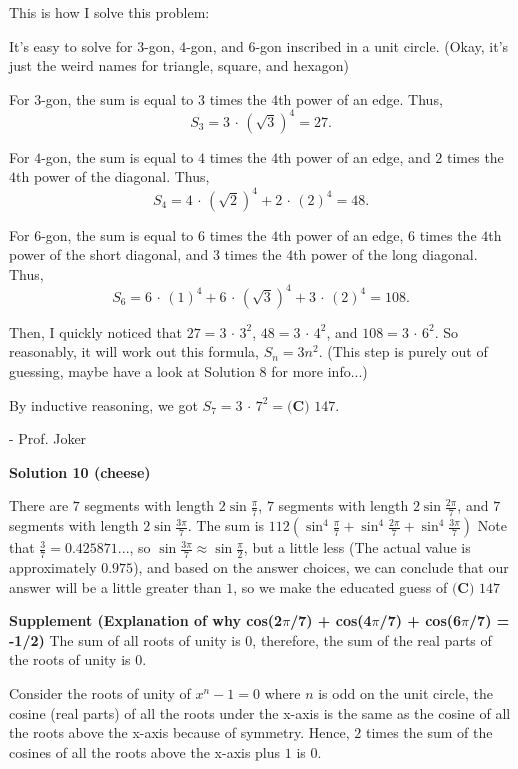 \begin{enumerate}
This is how I solve this problem:

 It's easy to solve for $3$-gon, $4$-gon, and $6$-gon inscribed in a unit circle. (Okay, it's just the weird names for triangle, square, and hexagon)

 For $3$-gon, the sum is equal to $3$ times the $4$th power of an edge. Thus, 
 \[S_3=3\,\cdot\,\left(\sqrt{3}\right)^4=27.\]

 For $4$-gon, the sum is equal to $4$ times the $4$th power of an edge, and $2$ times the $4$th power of the diagonal. Thus, 
 \[S_4=4\,\cdot\,\left(\sqrt{2}\right)^4+2\,\cdot\,\left(2\right)^4=48.\]

 For $6$-gon, the sum is equal to $6$ times the $4$th power of an edge, $6$ times the $4$th power of the short diagonal, and $3$ times the $4$th power of the long diagonal. Thus, 
 \[S_6=6\,\cdot\,\left(1\right)^4+6\,\cdot\,\left(\sqrt{3}\right)^4+3\,\cdot\,\left(2\right)^4=108.\]

 Then, I quickly noticed that $27=3\,\cdot\,3^2$, $48=3\,\cdot\,4^2$, and $108=3\,\cdot\,6^2$. So reasonably, it will work out this formula, $S_n=3n^2$. (This step is purely out of guessing, maybe have a look at Solution 8 for more info...)

 By inductive reasoning, we got $S_7=3\,\cdot\,7^2=\boxed{\textbf{(C) }147}$.

 - Prof. Joker

 



\textbf{Solution 10 (cheese)}

There are $7$ segments with length $2\sin{\frac{\pi}{7}}$, $7$ segments with length $2\sin{\frac{2\pi}{7}}$, and $7$ segments with length $2\sin{\frac{3\pi}{7}}$. The sum is $112(\sin^4\frac{\pi}{7}+\sin^4\frac{2\pi}{7}+\sin^4\frac{3\pi}{7})$ Note that $\frac{3}{7} = 0.425871...$, so $\sin\frac{3\pi}{7} \approx \sin\frac{\pi}{2}$, but a little less (The actual value is approximately $0.975$), and based on the answer choices, we can conclude that our answer will be a little greater than $1$, so we make the educated guess of $\boxed{\textbf{(C) }147}$

 \textbf{Supplement (Explanation of why cos(2$\pi$/7) + cos(4$\pi$/7) + cos(6$\pi$/7) = -1/2)} The sum of all roots of unity is $0$, therefore, the sum of the real parts of the roots of unity is $0$. 

 Consider the roots of unity of $x^n-1=0$ where $n$ is odd on the unit circle, the cosine (real parts) of all the roots under the x-axis is the same as the cosine of all the roots above the x-axis because of symmetry. Hence, $2$ times the sum of the cosines of all the roots above the x-axis plus $1$ is $0$.


\end{enumerate}
